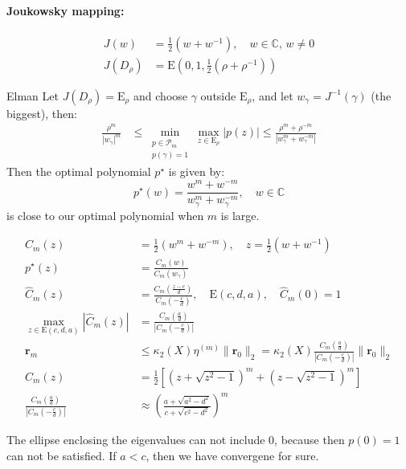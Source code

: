 \paragraph{Joukowsky mapping:}
\begin{align*}
    J(w) &= \frac{1}{2}(w + w^{-1}), \quad w \in \mathbb{C}, \, w \neq 0 \\
    J(D_\rho) & = \mathrm{E}(0,1, \frac12(\rho + \rho^{-1}))
\end{align*}
\begin{theorem}{Elman}{}
    Let $J(D_\rho) = \mathrm{E}_\rho$ and choose $\gamma$ outside $\mathrm{E}_\rho$, and let  $ w_\gamma = J^{-1}(\gamma)$ (the biggest), then:
    \begin{align*}
        \frac{\rho^m}{|w_\gamma|^m} & \leq \min_{\substack{p \in \mathcal{P}_m \\ p(\gamma) = 1}} \max_{z \in \mathrm{E}_\rho} |p(z)| \leq \frac{\rho^m + \rho^{-m}}{|w_\gamma^m + w_\gamma^{-m}|}
    \end{align*}
    Then the optimal polynomial $p^\star$ is given by:
    \[
        p^\star(w) = \frac{w^m + w^{-m}}{w_\gamma^m + w_\gamma^{-m}}, \quad w \in \mathbb{C}
    \]
    is close to our optimal polynomial when $m$ is large.
\end{theorem}

\begin{align*}
    C_m(z) & = \frac{1}{2}(w^m + w^{-m}), \quad z = \frac{1}{2}(w + w^{-1}) \\
    p^\star(z) & = \frac{C_m(w)}{C_m(w_\gamma)} \\
    \hat{C}_m(z) & = \frac{C_m(\frac{z - c}{d})}{C_m(-\frac{c}{d})}, \quad \mathrm{E}(c,d,a), \quad \hat{C}_m(0) = 1 \\
    \max_{z \in \mathrm{E}(c,d,a)} |\hat{C}_m(z)| & = \frac{C_m(\frac{a}{d})}{|C_m(-\frac{c}{d})|}\\
    \mathbf{r}_m & \leq \kappa_2(X) \eta^{(m)} \|\mathbf{r}_0\|_2 = \kappa_2(X) \frac{C_m(\frac{a}{d})}{|C_m(-\frac{c}{d})|} \|\mathbf{r}_0\|_2 \\
    C_m(z) & = \frac{1}{2}\left[\left(z + \sqrt{z^2 - 1}\right)^m + \left(z - \sqrt{z^2 - 1}\right)^m\right] \\
    \frac{C_m(\frac{a}{d})}{|C_m(-\frac{c}{d})|} &\approx \left(\frac{a + \sqrt{a^2 - d^2}}{c + \sqrt{c^2 - d^2}}\right)^m
\end{align*}

The ellipse enclosing the eigenvalues can not include $0$, because then $p(0) = 1$ can not be satisfied.
If $a < c$, then we have convergene for sure.




